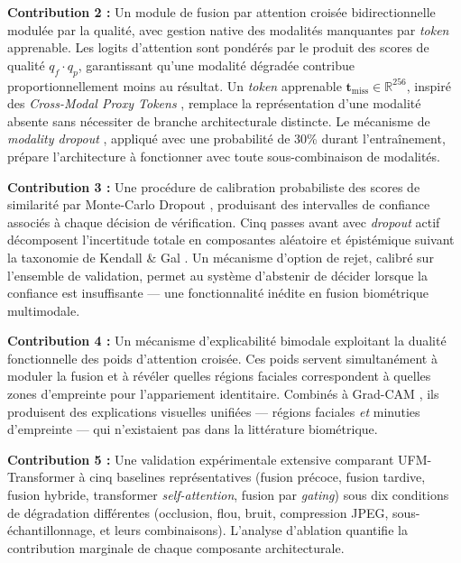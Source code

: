 \documentclass[12pt,a4paper]{report}
\begin{document}
\textbf{Contribution 2 :} Un module de fusion par attention crois\'{e}e bidirectionnelle modul\'{e}e par la qualit\'{e}, avec gestion native des modalit\'{e}s manquantes par \emph{token} apprenable. Les logits d'attention sont pond\'{e}r\'{e}s par le produit des scores de qualit\'{e} $q_f \cdot q_p$, garantissant qu'une modalit\'{e} d\'{e}grad\'{e}e contribue proportionnellement moins au r\'{e}sultat. Un \emph{token} apprenable $\mathbf{t}_{\text{miss}} \in \mathbb{R}^{256}$, inspir\'{e} des \emph{Cross-Modal Proxy Tokens} \cite{reza2025cmpt}, remplace la repr\'{e}sentation d'une modalit\'{e} absente sans n\'{e}cessiter de branche architecturale distincte. Le m\'{e}canisme de \emph{modality dropout} \cite{neverova2016moddrop}, appliqu\'{e} avec une probabilit\'{e} de 30\% durant l'entra\^{i}nement, pr\'{e}pare l'architecture \`{a} fonctionner avec toute sous-combinaison de modalit\'{e}s.

\textbf{Contribution 3 :} Une proc\'{e}dure de calibration probabiliste des scores de similarit\'{e} par Monte-Carlo Dropout \cite{gal2016dropout}, produisant des intervalles de confiance associ\'{e}s \`{a} chaque d\'{e}cision de v\'{e}rification. Cinq passes avant avec \emph{dropout} actif d\'{e}composent l'incertitude totale en composantes al\'{e}atoire et \'{e}pist\'{e}mique suivant la taxonomie de Kendall \& Gal \cite{kendall2017uncertainties}. Un m\'{e}canisme d'option de rejet, calibr\'{e} sur l'ensemble de validation, permet au syst\`{e}me d'abstenir de d\'{e}cider lorsque la confiance est insuffisante --- une fonctionnalit\'{e} in\'{e}dite en fusion biom\'{e}trique multimodale.

\textbf{Contribution 4 :} Un m\'{e}canisme d'explicabilit\'{e} bimodale exploitant la dualit\'{e} fonctionnelle des poids d'attention crois\'{e}e. Ces poids servent simultan\'{e}ment \`{a} moduler la fusion et \`{a} r\'{e}v\'{e}ler quelles r\'{e}gions faciales correspondent \`{a} quelles zones d'empreinte pour l'appariement identitaire. Combin\'{e}s \`{a} Grad-CAM \cite{selvaraju2017grad}, ils produisent des explications visuelles unifi\'{e}es --- r\'{e}gions faciales \textit{et} minuties d'empreinte --- qui n'existaient pas dans la litt\'{e}rature biom\'{e}trique.

\textbf{Contribution 5 :} Une validation exp\'{e}rimentale extensive comparant UFM-Transformer \`{a} cinq baselines repr\'{e}sentatives (fusion pr\'{e}coce, fusion tardive, fusion hybride, transformer \emph{self-attention}, fusion par \emph{gating}) sous dix conditions de d\'{e}gradation diff\'{e}rentes (occlusion, flou, bruit, compression JPEG, sous-\'{e}chantillonnage, et leurs combinaisons). L'analyse d'ablation quantifie la contribution marginale de chaque composante architecturale.
\end{document}
